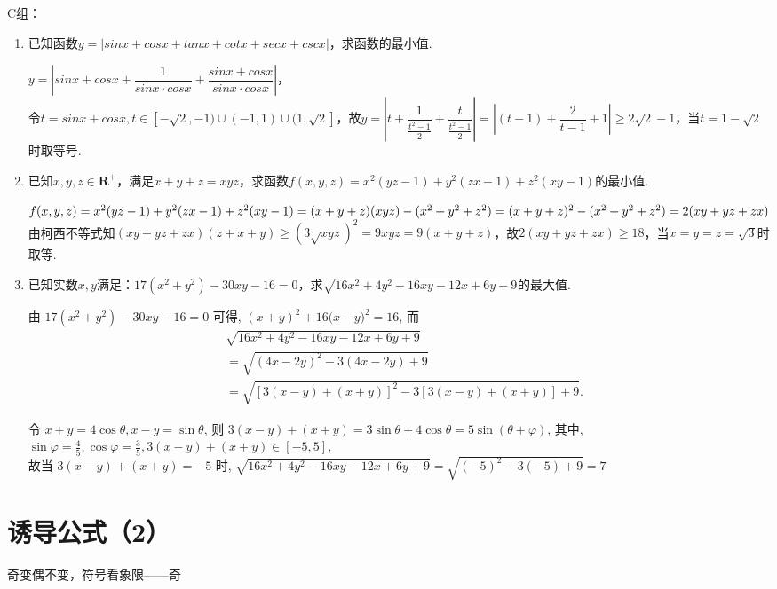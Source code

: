 C组：
\begin{enumerate}
    \item 已知函数$y = |sinx + cosx + tanx + cotx + secx + cscx|$，求函数的最小值.
    \begin{jieda}
        $y = |sinx + cosx + \dfrac{1}{sinx \cdot cosx} + \dfrac{sinx + cosx}{sinx \cdot cosx}|$，\\
        令$t = sinx + cosx, t \in [-\sqrt{2}, -1) \cup (-1, 1) \cup (1, \sqrt{2}]$，故$y = |t + \dfrac{1}{\frac{t^2 - 1}{2}} + \dfrac{t}{\frac{t^2 - 1}{2}}| = |(t-1) + \dfrac{2}{t-1} + 1| \geq 2\sqrt{2} - 1$，当$t = 1-\sqrt{2}$时取等号.
    \end{jieda}
    \item 已知$x, y, z \in \mathbf{R^+}$，满足$x+y+z = xyz$，求函数$f(x,y,z) = x^2(yz-1)+y^2(zx-1)+z^2(xy-1)$的最小值.
    \begin{jieda}
        $f(x,y,z) = x^2(yz-1)+y^2(zx-1)+z^2(xy-1) = (x+y+z)(xyz)-(x^2+y^2+z^2) \\
        = (x+y+z)^2-(x^2+y^2+z^2) = 2(xy+yz+zx)$ \\
        由柯西不等式知$(xy+yz+zx)(z+x+y) \geq (3\sqrt{xyz})^2 = 9xyz = 9(x+y+z)$，故$2(xy+yz+zx) \geq 18$，当$x = y = z = \sqrt{3}$时取等.
    \end{jieda}
    
    \item 已知实数$x, y$满足：$17(x^2+y^2)-30xy-16 = 0$，求$\sqrt{16x^2 + 4y^2-16xy - 12x+6y + 9}$的最大值.
    \begin{jieda}
由 $17\left(x^2+y^2\right)-30 x y-16=0$ 可得, $(x+y)^2+16(x$ $-y)^2=16$,
而
$$
\begin{aligned}
&\sqrt{16 x^2+4 y^2-16 x y-12 x+6 y+9} \\
& =\sqrt{(4 x-2 y)^2-3(4 x-2 y)+9} \\
& =\sqrt{[3(x-y)+(x+y)]^2-3[3(x-y)+(x+y)]+9} .
\end{aligned}
$$


令 $x+y=4 \cos \theta, x-y=\sin \theta$,
则 $3(x-y)+(x+y)=3 \sin \theta+4 \cos \theta=5 \sin (\theta+\varphi)$,
其中, $\sin \varphi=\frac{4}{5}, \cos \varphi=\frac{3}{5}, 3(x-y)+(x+y) \in[-5,5]$,\\
故当 $3(x-y)+(x+y)=-5$ 时,
$\sqrt{16 x^2+4 y^2-16 x y-12 x+6 y+9}=\sqrt{(-5)^2-3(-5)+9} =7$

    \end{jieda}
    
\end{enumerate}

\section{诱导公式（2）}
\zsd 奇变偶不变，符号看象限——奇

